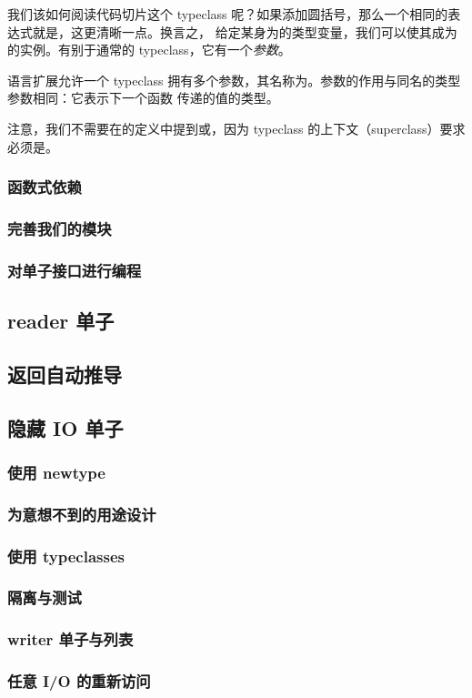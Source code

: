 \documentclass[./main.tex]{subfiles}
\begin{document}
我们该如何阅读代码切片这个 typeclass 呢？如果添加圆括号，那么一个相同的表达式就是，这更清晰一点。换言之，
给定某身为的类型变量，我们可以使其成为的实例。有别于通常的 typeclass，它有一个\textit{参数}。

语言扩展允许一个 typeclass 拥有多个参数，其名称为。参数的作用与同名的类型参数相同：它表示下一个函数
传递的值的类型。

注意，我们不需要在的定义中提到\acode{(>>=)}或，因为 typeclass 的上下文（superclass）要求
必须是。

\subsubsection*{函数式依赖}


\subsubsection*{完善我们的模块}

\subsubsection*{对单子接口进行编程}

\subsection*{reader 单子}

\subsection*{返回自动推导}

\subsection*{隐藏 IO 单子}

\subsubsection*{使用 newtype}

\subsubsection*{为意想不到的用途设计}

\subsubsection*{使用 typeclasses}

\subsubsection*{隔离与测试}

\subsubsection*{writer 单子与列表}

\subsubsection*{任意 I/O 的重新访问}
\end{document}
